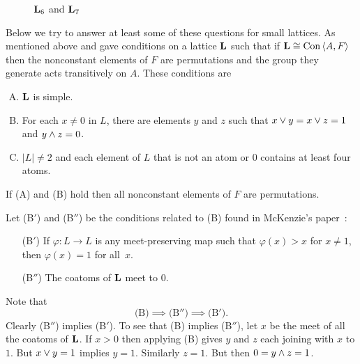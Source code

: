 \begin{figure}[htb]
\begin{center}
  \begin{tikzpicture}[scale=1]
    
  \end{tikzpicture}
  \hskip15mm
  \begin{tikzpicture}[scale=1]
    
  \end{tikzpicture}
\end{center}
\caption{$\bL_{6}$ and $\bL_7$}\label{fig:L6and7}
\end{figure}



Below we try to answer at least
some of these questions for small lattices. 
As mentioned above \Palfy and \Pudlak gave conditions on a lattice $\bL$ 
such that if $\bL \cong \Con \<A,F\>$ then the nonconstant elements of $F$ are 
permutations and the group they generate acts transitively on $A$. 
These conditions are
\begin{enumerate}[(A)]
\item $\bL$ is simple.
\item For each $x \ne 0$ in $L$, there are elements $y$ and $z$
such that $x \join y = x \join z = 1$ and $y\meet z = 0$.
\item $|L|\ne 2$ and each element of $L$ that is not an atom or $0$ contains at
least four atoms.
\end{enumerate}
If (A) and (B) hold then all nonconstant elements of $F$ are permutations.

Let (B$'$) and (B$''$) be the conditions related to (B) found in McKenzie's
paper~\cite{McKenzie1983}:
\begin{enumerate}
\item[(B$'$)]
If $\varphi: L \to L$ is any meet-preserving map such that $\varphi(x) > x$ for
$x\ne 1$, then $\varphi(x) = 1$ for all~$x$.
\item[(B$''$)]
The coatoms of $\bL$ meet to $0$.
\end{enumerate}
Note that
\[
\text{(B)} \implies \text{(B$''$)}  \implies \text{(B$'$)}.
\]
Clearly (B$''$) implies (B$'$). To see that (B) implies (B$''$),
let $x$ be the meet of all the coatoms of $\bL$. If $x > 0$
then applying (B) gives $y$ and $z$ each joining with $x$ to $1$.
But $x\join y = 1$ implies $y = 1$. Similarly $z = 1$. But then
$0 = y \meet z = 1$.



